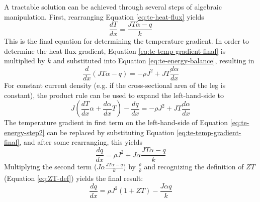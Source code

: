 \documentclass[preprint,authoryear,12pt]{elsarticle}
\begin{document}
A tractable solution can be achieved through several steps of
algebraic manipulation.  First, rearranging Equation
\ref{eq:te-heat-flux} yields
\begin{equation}
  \label{eq:te-temp-gradient-final}
  \frac{dT}{dx} = \frac{J T \alpha -q}{k}
\end{equation}
This is the final equation for determining the temperature
gradient. In order to determine the heat flux gradient, Equation
\ref{eq:te-temp-gradient-final} is multiplied by $k$ and substituted
into Equation \ref{eq:te-energy-balance}, resulting in
\begin{equation}
  \label{eq:te-energy-step1}
  \frac{d}{dx} \left( J T \alpha - q \right) = - \rho J^2 + J T \frac{d
    \alpha}{d x}
\end{equation}
For constant current density (e.g. if the cross-sectional area of the
leg is constant), the product rule can be used to expand the
left-hand-side to
\begin{equation}
  \label{eq:te-energy-step2}
  J \left( \frac{dT}{dx} \alpha + \frac{d \alpha}{dx} T \right) -
  \frac{dq}{dx} = -
  \rho J^2 + J T \frac{d \alpha}{d x}  
\end{equation}
The temperature gradient in first term on the left-hand-side of
Equation \ref{eq:te-energy-step2} can be replaced by substituting
Equation \ref{eq:te-temp-gradient-final}, and after some rearranging,
this yields
\begin{equation}
  \label{eq:te-energy-step3}
  \frac{dq}{dx} = \rho J^2 + J \alpha \frac{J T \alpha -q}{k}
\end{equation}
Multiplying the second term ($J \alpha \frac{J T \alpha -q}{k}$) by
$\frac{\rho}{\rho}$ and recognizing the definition of $ZT$ (Equation
\ref{eq:ZT-def}) yields the final result:
\begin{equation}
  \label{eq:te-energy-final}
  \frac{dq}{dx} = \rho J^2 \left( 1 + ZT \right) - \frac{J \alpha
    q}{k} 
\end{equation}
\end{document}
